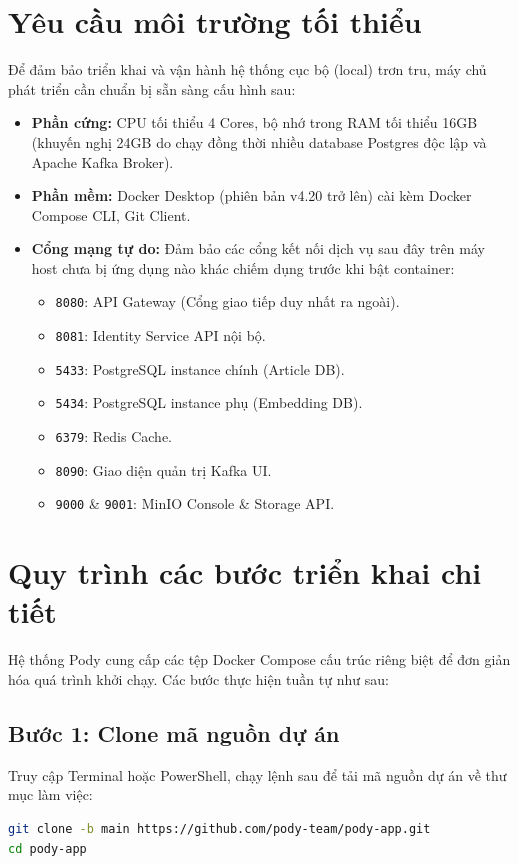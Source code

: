 \documentclass[14pt,a4paper,oneside]{extreport}
\begin{document}
\section{Yêu cầu môi trường tối thiểu}
Để đảm bảo triển khai và vận hành hệ thống cục bộ (local) trơn tru, máy chủ phát triển cần chuẩn bị sẵn sàng cấu hình sau:
\begin{itemize}[leftmargin=1.5cm]
  \item \textbf{Phần cứng:} CPU tối thiểu 4 Cores, bộ nhớ trong RAM tối thiểu 16GB (khuyến nghị 24GB do chạy đồng thời nhiều database Postgres độc lập và Apache Kafka Broker).
  \item \textbf{Phần mềm:} Docker Desktop (phiên bản v4.20 trở lên) cài kèm Docker Compose CLI, Git Client.
  \item \textbf{Cổng mạng tự do:} Đảm bảo các cổng kết nối dịch vụ sau đây trên máy host chưa bị ứng dụng nào khác chiếm dụng trước khi bật container:
    \begin{itemize}
      \item \texttt{8080}: API Gateway (Cổng giao tiếp duy nhất ra ngoài).
      \item \texttt{8081}: Identity Service API nội bộ.
      \item \texttt{5433}: PostgreSQL instance chính (Article DB).
      \item \texttt{5434}: PostgreSQL instance phụ (Embedding DB).
      \item \texttt{6379}: Redis Cache.
      \item \texttt{8090}: Giao diện quản trị Kafka UI.
      \item \texttt{9000} \& \texttt{9001}: MinIO Console \& Storage API.
    \end{itemize}
\end{itemize}

\section{Quy trình các bước triển khai chi tiết}
Hệ thống Pody cung cấp các tệp Docker Compose cấu trúc riêng biệt để đơn giản hóa quá trình khởi chạy. Các bước thực hiện tuần tự như sau:

\subsection{Bước 1: Clone mã nguồn dự án}
Truy cập Terminal hoặc PowerShell, chạy lệnh sau để tải mã nguồn dự án về thư mục làm việc:
\begin{lstlisting}[language=bash]
git clone -b main https://github.com/pody-team/pody-app.git
cd pody-app
\end{lstlisting}
\end{document}
